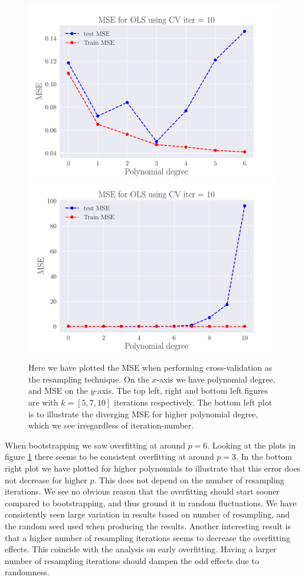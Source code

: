 \documentclass[reprint,english,notitlepage,aps,nobalancelastpage,nofootinbib]{revtex4-1}  %
\begin{document}
\begin{figure}[H]
	\includegraphics[width=\linewidth]{MSE_OLS_n30_eps02_pol6_CV_re10.pdf}
	\endminipage\hfill
	\includegraphics[width=\linewidth]{MSE_OLS_n30_eps02_pol10_CV_re10.pdf}
	\endminipage
	\caption{Here we have plotted the MSE when performing cross-validation as the resampling technique. On the $x$-axis we have polynomial degree, and MSE on the $y$-axis. The top left, right and bottom left figures are with $k=[5, 7, 10]$ iterations respectively. The bottom left plot is to illustrate the diverging MSE for higher polynomial degree, which we see irregardless of iteration-number.} \label{fig:CV_OLS}
\end{figure}

When bootstrapping we saw overfitting at around $p=6$. Looking at the plots in figure \ref{fig:CV_OLS} there seems to be consistent overfitting at around $p=3$. In the bottom right plot we have plotted for higher polynomials to illustrate that this error does not decrease for higher $p$. This does not depend on the number of resampling iterations. We see no obvious reason that the overfitting should start sooner compared to bootstrapping, and thus ground it in random fluctuations. We have consistently seen large variation in results based on number of resampling, and the random seed used when producing the results. Another interesting result is that a higher number of resampling iterations seems to decrease the overfitting effects. This coincide with the analysis on early overfitting. Having a larger number of resampling iterations should dampen the odd effects due to randomness.
\end{document}
